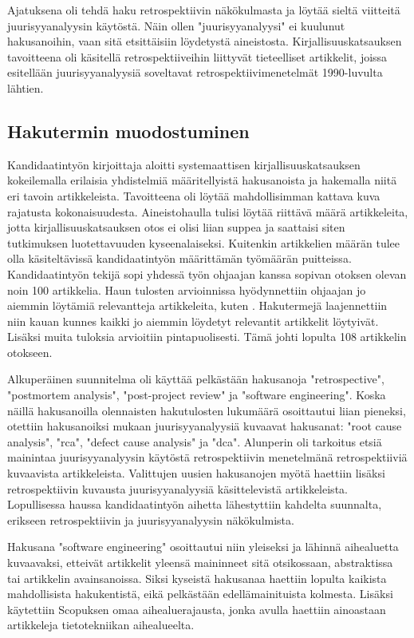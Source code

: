 Ajatuksena oli tehdä haku retrospektiivin näkökulmasta ja löytää sieltä viitteitä juurisyyanalyysin käytöstä. Näin ollen "juurisyyanalyysi" ei kuulunut hakusanoihin, vaan sitä etsittäisiin löydetystä aineistosta. Kirjallisuuskatsauksen tavoitteena oli käsitellä retrospektiiveihin liittyvät tieteelliset artikkelit, joissa esitellään juurisyyanalyysiä soveltavat retrospektiivimenetelmät 1990-luvulta lähtien.

\subsection{Hakutermin muodostuminen}
Kandidaatintyön kirjoittaja aloitti systemaattisen kirjallisuuskatsauksen kokeilemalla erilaisia yhdistelmiä määritellyistä hakusanoista ja hakemalla niitä eri tavoin artikkeleista. Tavoitteena oli löytää mahdollisimman kattava kuva rajatusta kokonaisuudesta. Aineistohaulla tulisi löytää riittävä määrä artikkeleita, jotta kirjallisuuskatsauksen otos ei olisi liian suppea ja saattaisi siten tutkimuksen luotettavuuden kyseenalaiseksi. Kuitenkin artikkelien määrän tulee olla käsiteltävissä kandidaatintyön määrittämän työmäärän puitteissa. Kandidaatintyön tekijä sopi yhdessä työn ohjaajan kanssa sopivan otoksen olevan noin 100 artikkelia. Haun tulosten arvioinnissa hyödynnettiin ohjaajan jo aiemmin löytämiä relevantteja artikkeleita, kuten \citep{Bjornson2009, card1998learning}. Hakutermejä laajennettiin niin kauan kunnes kaikki jo aiemmin löydetyt relevantit artikkelit löytyivät. Lisäksi muita tuloksia arvioitiin pintapuolisesti. Tämä johti lopulta 108 artikkelin otokseen.

Alkuperäinen suunnitelma oli käyttää pelkästään hakusanoja "retrospective",  "postmortem analysis", "post-project review" ja "software engineering". Koska näillä hakusanoilla olennaisten hakutulosten lukumäärä osoittautui liian pieneksi, otettiin hakusanoiksi mukaan juurisyyanalyysiä kuvaavat hakusanat: "root cause analysis", "rca", "defect cause analysis" ja "dca". Alunperin oli tarkoitus etsiä mainintaa juurisyyanalyysin käytöstä retrospektiivin menetelmänä retrospektiiviä kuvaavista artikkeleista. Valittujen uusien hakusanojen myötä haettiin lisäksi retrospektiivin kuvausta juurisyyanalyysiä käsittelevistä artikkeleista. Lopullisessa haussa kandidaatintyön aihetta lähestyttiin kahdelta suunnalta, erikseen retrospektiivin ja juurisyyanalyysin näkökulmista.

Hakusana "software engineering" osoittautui niin yleiseksi ja lähinnä aihealuetta kuvaavaksi, etteivät artikkelit yleensä maininneet sitä otsikossaan, abstraktissa tai artikkelin avainsanoissa. Siksi kyseistä hakusanaa haettiin lopulta kaikista mahdollisista hakukentistä, eikä pelkästään edellämainituista kolmesta. Lisäksi käytettiin Scopuksen omaa aihealuerajausta, jonka avulla haettiin ainoastaan artikkeleja tietotekniikan aihealueelta.

